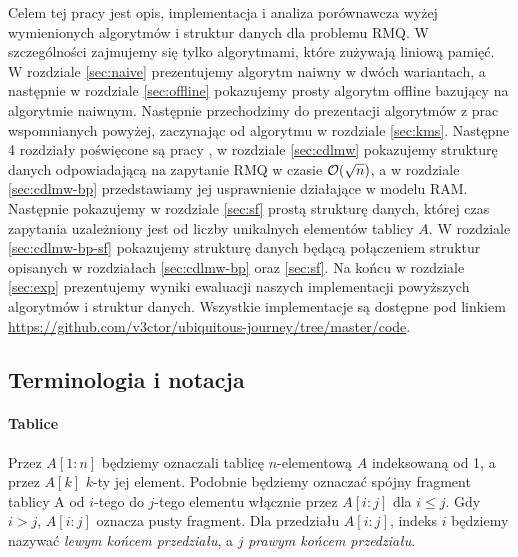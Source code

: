 Celem tej pracy jest opis, implementacja i analiza porównawcza wyżej wymienionych algorytmów i struktur danych dla problemu \textsc{RMQ}. W szczególności zajmujemy się tylko algorytmami, które zużywają liniową pamięć. W rozdziale \ref{sec:naive} prezentujemy algorytm naiwny w dwóch wariantach, a następnie w rozdziale \ref{sec:offline} pokazujemy prosty algorytm offline bazujący na algorytmie naiwnym. Następnie przechodzimy do prezentacji algorytmów z prac wspomnianych powyżej, zaczynając od algorytmu \cite{kriz05} w rozdziale \ref{sec:kms}. Następne 4 rozdziały poświęcone są pracy \cite{chan14}, w rozdziale \ref{sec:cdlmw} pokazujemy strukturę danych odpowiadającą na zapytanie \textsc{RMQ} w czasie $\mathcal{O}(\sqrt{n})$, a w rozdziale \ref{sec:cdlmw-bp} przedstawiamy jej usprawnienie działające w modelu \textsc{RAM}. Następnie pokazujemy w rozdziale \ref{sec:sf} prostą strukturę danych, której czas zapytania uzależniony jest od liczby unikalnych elementów tablicy $A$. W rozdziale \ref{sec:cdlmw-bp-sf} pokazujemy strukturę danych będącą połączeniem struktur opisanych w rozdziałach \ref{sec:cdlmw-bp} oraz \ref{sec:sf}. Na końcu w rozdziale \ref{sec:exp} prezentujemy wyniki ewaluacji naszych implementacji powyższych algorytmów i struktur danych. Wszystkie implementacje są dostępne pod linkiem \url{https://github.com/v3ctor/ubiquitous-journey/tree/master/code}.



\subsection{Terminologia i notacja}
\paragraph{Tablice} Przez $A[1:n]$ będziemy oznaczali tablicę $n$-elementową $A$ indeksowaną od 1, a przez $A[k]$ $k$-ty jej element. Podobnie będziemy oznaczać spójny fragment tablicy A od $i$-tego do $j$-tego elementu włącznie przez $A[i:j]$ dla $i \le j$. Gdy $i > j$, $A[i:j]$ oznacza pusty fragment. Dla przedziału $A[i:j]$, indeks $i$ będziemy nazywać \emph{lewym końcem przedziału}, a $j$ \emph{prawym końcem przedziału}. %
